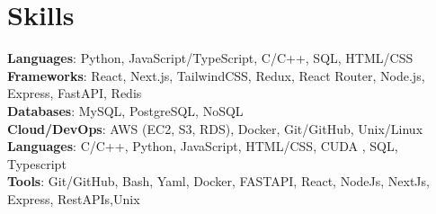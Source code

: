 
    
     
     
     
     


\section{Skills}
 \begin{itemize}[leftmargin=0.15in, label={}]
    \small{\item{

     \textbf{Languages}{: Python, JavaScript/TypeScript, C/C++, SQL, HTML/CSS} \\

      \textbf{Frameworks}{: React, Next.js, TailwindCSS, Redux, React Router, Node.js, Express, FastAPI, Redis} \\


     \textbf{Databases}{: MySQL, PostgreSQL, NoSQL} \\

     \textbf{Cloud/DevOps}{: AWS (EC2, S3, RDS), Docker, Git/GitHub, Unix/Linux} \\


    
     \textbf{Languages}{: C/C++, Python, JavaScript, HTML/CSS, CUDA , SQL, Typescript} \\
     
     \textbf{Tools}{: Git/GitHub, Bash, Yaml, Docker, FASTAPI, React, NodeJs, NextJs, Express, RestAPIs,Unix}
    }}
 \end{itemize}

